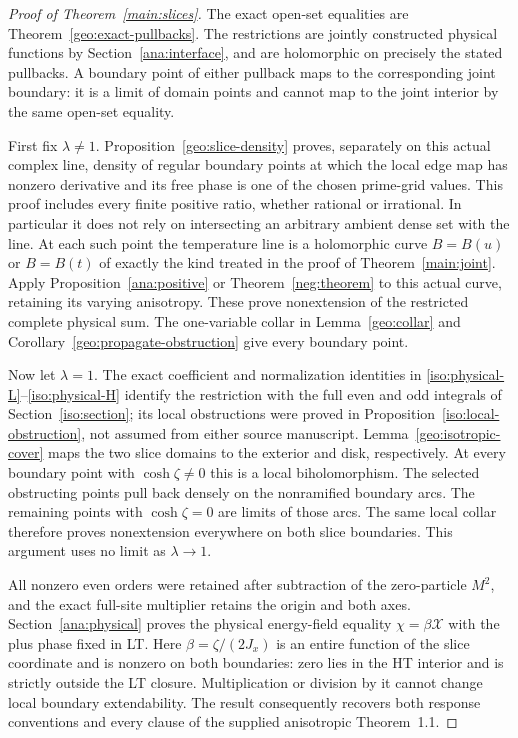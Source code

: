 \documentclass[11pt]{article}
\numberwithin{equation}{section}
\theoremstyle{definition}
\begin{document}
\begin{proof}[Proof of Theorem~\ref{main:slices}]
The exact open-set equalities are Theorem~\ref{geo:exact-pullbacks}.
The restrictions are jointly constructed physical functions by
Section~\ref{ana:interface}, and are holomorphic on precisely the
stated pullbacks. A boundary point of either pullback maps to the
corresponding joint boundary: it is a limit of domain points and
cannot map to the joint interior by the same open-set equality.

First fix \(\lambda\ne1\). Proposition~\ref{geo:slice-density}
proves, separately on this actual complex line, density of regular
boundary points at which the local edge map has nonzero derivative
and its free phase is one of the chosen prime-grid values. This
proof includes every finite positive ratio, whether rational or
irrational. In particular it does not rely on intersecting an
arbitrary ambient dense set with the line. At each such point the
temperature line is a holomorphic curve \(B=B(u)\) or \(B=B(t)\)
of exactly the kind treated in the proof of Theorem~\ref{main:joint}.
Apply Proposition~\ref{ana:positive} or Theorem~\ref{neg:theorem}
to this actual curve, retaining its varying anisotropy. These prove
nonextension of the restricted complete physical sum. The
one-variable collar in Lemma~\ref{geo:collar} and
Corollary~\ref{geo:propagate-obstruction} give every boundary point.

Now let \(\lambda=1\). The exact coefficient and normalization
identities in \eqref{iso:physical-L}--\eqref{iso:physical-H}
identify the restriction with the full even and odd integrals of
Section~\ref{iso:section}; its local obstructions were proved in
Proposition~\ref{iso:local-obstruction}, not assumed from either
source manuscript. Lemma~\ref{geo:isotropic-cover} maps the two
slice domains to the exterior and disk, respectively. At every
boundary point with \(\cosh\zeta\ne0\) this is a local
biholomorphism. The selected obstructing points pull back densely
on the nonramified boundary arcs. The remaining points with
\(\cosh\zeta=0\) are limits of those arcs. The same local collar
therefore proves nonextension everywhere on both slice boundaries.
This argument uses no limit as \(\lambda\to1\).

All nonzero even orders were retained after subtraction of the
zero-particle \(M^2\), and the exact full-site multiplier retains
the origin and both axes. Section~\ref{ana:physical} proves the
physical energy-field equality \(\chi=\beta\mathcal X\) with
the plus phase fixed in LT. Here \(\beta=\zeta/(2J_x)\) is an
entire function of the slice coordinate and is nonzero on both
boundaries: zero lies in the HT interior and is strictly outside
the LT closure. Multiplication or division by it cannot change
local boundary extendability. The result consequently recovers
both response conventions and every clause of the supplied
anisotropic Theorem~1.1.
\end{proof}
\end{document}
